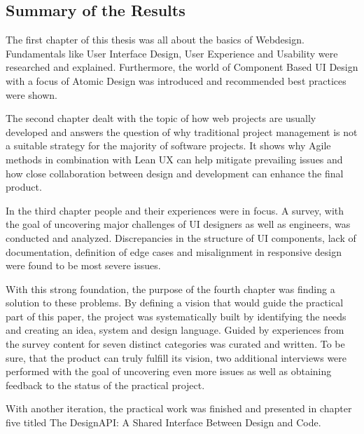 \newpage
\subsection{Summary of the Results}
The first chapter of this thesis was all about the basics of Webdesign. Fundamentals like User
Interface Design, User Experience and Usability were researched and explained. Furthermore, the
world of Component Based UI Design with a focus of Atomic Design was introduced and recommended best
practices were shown.

The second chapter dealt with the topic of how web projects are usually developed and answers the
question of why traditional project management is not a suitable strategy for the majority of
software projects. It shows why Agile methods in combination with Lean UX can help mitigate
prevailing issues and how close collaboration between design and development can enhance the final
product. 

In the third chapter people and their experiences were in focus. A survey, with the goal of
uncovering major challenges of UI designers as well as engineers, was conducted and analyzed.
Discrepancies in the structure of UI components, lack of documentation, definition of edge cases and
misalignment in responsive design were found to be most severe issues.

With this strong foundation, the purpose of the fourth chapter was finding a solution to these
problems. By defining a vision that would guide the practical part of this paper, the project was
systematically built by identifying the needs and creating an idea, system and design language.
Guided by experiences from the survey content for seven distinct categories was curated and written.
To be sure, that the product can truly fulfill its vision, two additional interviews were performed
with the goal of uncovering even more issues as well as obtaining feedback to the status of the
practical project. 

With another iteration, the practical work was finished and presented in chapter five titled The
DesignAPI: A Shared Interface Between Design and Code. 